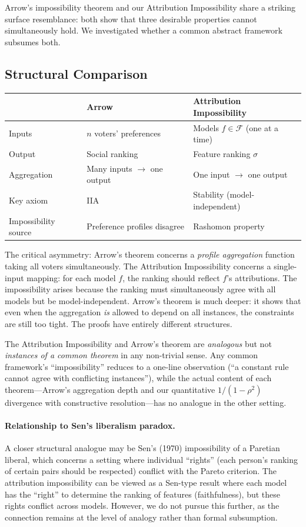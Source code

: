 \documentclass{article}
\begin{document}
Arrow's impossibility theorem and our Attribution Impossibility share a striking surface resemblance: both show that three desirable properties cannot simultaneously hold. We investigated whether a common abstract framework subsumes both.

\subsection{Structural Comparison}

\begin{center}
\small
\begin{tabular}{@{}lll@{}}
\toprule
& \textbf{Arrow} & \textbf{Attribution Impossibility} \\
\midrule
Inputs & $n$ voters' preferences & Models $f \in \mathcal{F}$ (one at a time) \\
Output & Social ranking & Feature ranking $\sigma$ \\
Aggregation & Many inputs $\to$ one output & One input $\to$ one output \\
Key axiom & IIA & Stability (model-independent) \\
Impossibility source & Preference profiles disagree & Rashomon property \\
\bottomrule
\end{tabular}
\end{center}

The critical asymmetry: Arrow's theorem concerns a \emph{profile aggregation} function taking all voters simultaneously. The Attribution Impossibility concerns a single-input mapping: for each model $f$, the ranking should reflect $f$'s attributions. The impossibility arises because the ranking must simultaneously agree with all models but be model-independent. Arrow's theorem is much deeper: it shows that even when the aggregation \emph{is} allowed to depend on all instances, the constraints are still too tight. The proofs have entirely different structures.

The Attribution Impossibility and Arrow's theorem are \emph{analogous} but not \emph{instances of a common theorem} in any non-trivial sense. Any common framework's ``impossibility'' reduces to a one-line observation (``a constant rule cannot agree with conflicting instances''), while the actual content of each theorem---Arrow's aggregation depth and our quantitative $1/(1-\rho^2)$ divergence with constructive resolution---has no analogue in the other setting.

\paragraph{Relationship to Sen's liberalism paradox.}
A closer structural analogue may be Sen's (1970) impossibility of a Paretian liberal, which concerns a setting where individual ``rights'' (each person's ranking of certain pairs should be respected) conflict with the Pareto criterion. The attribution impossibility can be viewed as a Sen-type result where each model has the ``right'' to determine the ranking of features (faithfulness), but these rights conflict across models. However, we do not pursue this further, as the connection remains at the level of analogy rather than formal subsumption.
\end{document}
